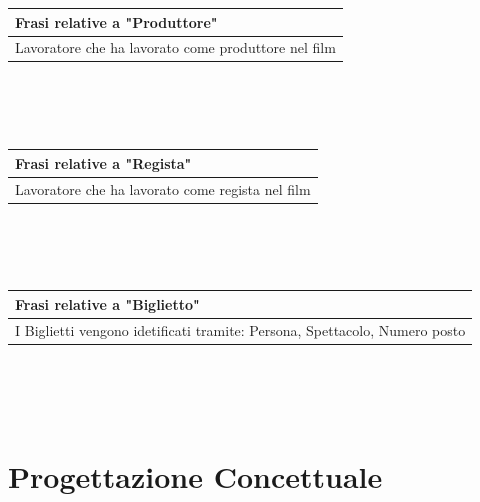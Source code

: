 \documentclass[10pt]{article}
\begin{document}
	\begin{tabular} { |p{16.8cm}| }
		\hline
		\rowcolor{lightgray}
		\textbf{Frasi relative a "Produttore"} \\
		\hline
		Lavoratore che ha lavorato come produttore nel film \\
		\hline 		
	\end{tabular} 
	\\\\\\
	\begin{tabular} { |p{16.8cm}| }
		\hline
		\rowcolor{lightgray}
		\textbf{Frasi relative a "Regista"} \\
		\hline
		Lavoratore che ha lavorato come regista nel film \\
		\hline 		
	\end{tabular} 
	\\\\\\
	\begin{tabular} { |p{16.8cm}| }
		\hline
		\rowcolor{lightgray}
		\textbf{Frasi relative a "Biglietto"} \\
		\hline
		I Biglietti vengono idetificati tramite: Persona, Spettacolo, Numero posto \\
		\hline 		
	\end{tabular} 
	\\\\\\
	
	
	\section{Progettazione Concettuale}	
\end{document}
